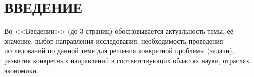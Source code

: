 \chapter*{\large ВВЕДЕНИЕ}  

Во <<Введении>> (до 3 страниц) обосновывается актуальность темы, её значение, выбор направления исследования, необходимость проведения исследований по данной теме для решения конкретной проблемы (задачи), развития конкретных направлений в соответствующих областях науки, отраслях экономики.

